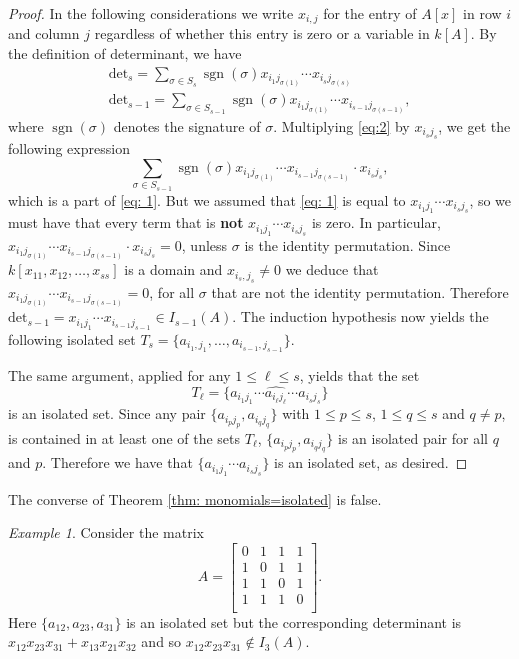 \documentclass[11pt,letterpaper, reqno]{amsart}
\theoremstyle{definition}
\theoremstyle{remark}
\newtheorem{example}[theorem]{Example}
\DeclareMathOperator{\sgn}{sgn}
\numberwithin{equation}{section}
\begin{document}
\begin{proof}
In the following considerations we write $x_{i,j}$ for the entry of $A[x]$ in row $i$ and column $j$ regardless of whether this entry is zero or a variable in $k[A]$. By the definition of determinant, we have 
\begin{align}
\text{det}_s  = \sum_{\sigma \in S_s}\sgn(\sigma)x_{i_1 j_{\sigma(1)}}\cdots x_{i_sj_{\sigma(s)}} \label{eq: 1}\\
\text{det}_{s-1}= \sum_{\sigma \in S_{s-1}}\sgn(\sigma)x_{i_1 j_{\sigma(1)}}\cdots x_{i_{s-1}j_{\sigma(s-1)}},  \label{eq:2}
\end{align}
where $\sgn(\sigma)$ denotes the signature of $\sigma.$
Multiplying \eqref{eq:2} by $x_{i_s j_s}$, we get the following expression
\[
\sum_{\sigma \in S_{s-1}}\sgn(\sigma)x_{i_1 j_{\sigma(1)}}\cdots x_{i_{s-1}j_{\sigma(s-1)}}\cdot x_{i_s j_s},
\]
which is a part of \eqref{eq: 1}. But we assumed that \eqref{eq: 1} is equal to $x_{i_1 j_1}\cdots x_{i_sj_s}$, so we must have that every term that is \textbf{not} $x_{i_1 j_1}\cdots x_{i_sj_s}$ is zero. In particular, $x_{i_1 j_{\sigma(1)}}\cdots x_{i_{s-1}j_{\sigma(s-1)}}\cdot x_{i_s j_s}=0$, unless $\sigma$ is the identity permutation. Since $k[x_{11},x_{12},\ldots, x_{ss}]$ is a domain and $x_{i_s,j_s}\neq 0$ we deduce that $x_{i_1 j_{\sigma(1)}}\cdots x_{i_{s-1}j_{\sigma(s-1)}}=0$, for all $\sigma$ that are not the identity permutation. Therefore  $\text{det}_{s-1}=x_{i_1 j_1}\cdots x_{i_{s-1}j_{s-1}}\in I_{s-1}(A)$.
The induction hypothesis now yields the following isolated set 
$T_{s}=\{a_{i_1,j_1},\ldots, a_{i_{s-1},j_{s-1}}\}$.



The same argument, applied for any $1\leq \ell \leq s$, yields that the set
\[
T_\ell=\{a_{i_1 j_1}\cdots \widehat{a_{i_\ell j_\ell}} \cdots a_{i_{s}j_{s}}\}
\]
is an isolated set. Since any pair $\{a_{i_p j_p},a_{i_qj_q}\}$  with $1\leq p \leq s$, $1\leq q\leq s$ and $q\neq p$, is contained in at least one of the sets  $T_\ell$, $\{a_{i_p j_p},a_{i_qj_q}\}$  is an isolated pair for all $q$ and $p$. Therefore we have that $\{a_{i_1 j_1}\cdots a_{i_{s}j_{s}}\}$ is an isolated set, as desired.
\end{proof}

The converse of Theorem \ref{thm: monomials=isolated} is false. 
\begin{example}
Consider the matrix 
\[
A = \begin{bmatrix}
    0&1&1&1\\
    1&0&1&1\\
    1&1&0&1\\
    1&1&1&0\\
\end{bmatrix}.
\]
Here $\{a_{12},a_{23},a_{31}\}$ is an isolated set but the corresponding determinant is $x_{12}x_{23}x_{31}+x_{13}x_{21}x_{32}$ and so $x_{12}x_{23}x_{31}\not\in I_3(A)$.
\end{example}
\end{document}
